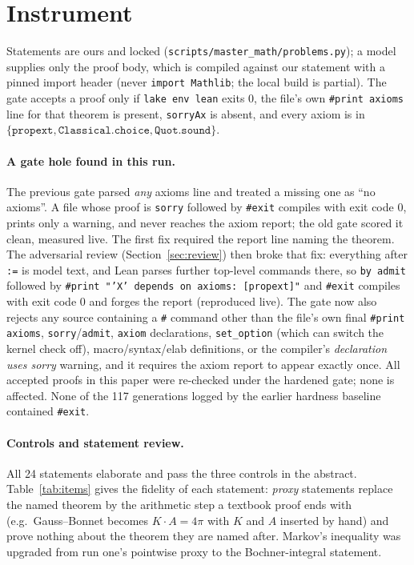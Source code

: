\documentclass[11pt]{article}
\begin{document}
\section{Instrument}
Statements are ours and locked (\texttt{scripts/master\_math/problems.py}); a model supplies only the proof body, which is compiled against our statement with a pinned import header (never \texttt{import Mathlib}; the local build is partial). The gate accepts a proof only if \texttt{lake env lean} exits 0, the file's own \texttt{\#print axioms} line for that theorem is present, \texttt{sorryAx} is absent, and every axiom is in $\{\texttt{propext},\texttt{Classical.choice},\texttt{Quot.sound}\}$.

\paragraph{A gate hole found in this run.} The previous gate parsed \emph{any} axioms line and treated a missing one as ``no axioms''. A file whose proof is \texttt{sorry} followed by \texttt{\#exit} compiles with exit code 0, prints only a warning, and never reaches the axiom report; the old gate scored it clean, measured live. The first fix required the report line naming the theorem. The adversarial review (Section~\ref{sec:review}) then broke that fix: everything after \texttt{:=} is model text, and Lean parses further top-level commands there, so \texttt{by admit} followed by \texttt{\#print "'X' depends on axioms: [propext]"} and \texttt{\#exit} compiles with exit code 0 and forges the report (reproduced live). The gate now also rejects any source containing a \texttt{\#} command other than the file's own final \texttt{\#print axioms}, \texttt{sorry}/\texttt{admit}, \texttt{axiom} declarations, \texttt{set\_option} (which can switch the kernel check off), macro/syntax/elab definitions, or the compiler's \emph{declaration uses sorry} warning, and it requires the axiom report to appear exactly once. All accepted proofs in this paper were re-checked under the hardened gate; none is affected. None of the 117 generations logged by the earlier hardness baseline contained \texttt{\#exit}.

\paragraph{Controls and statement review.} All 24 statements elaborate and pass the three controls in the abstract. Table~\ref{tab:items} gives the fidelity of each statement: \emph{proxy} statements replace the named theorem by the arithmetic step a textbook proof ends with (e.g.\ Gauss--Bonnet becomes $K\cdot A = 4\pi$ with $K$ and $A$ inserted by hand) and prove nothing about the theorem they are named after. Markov's inequality was upgraded from run one's pointwise proxy to the Bochner-integral statement.
\end{document}
